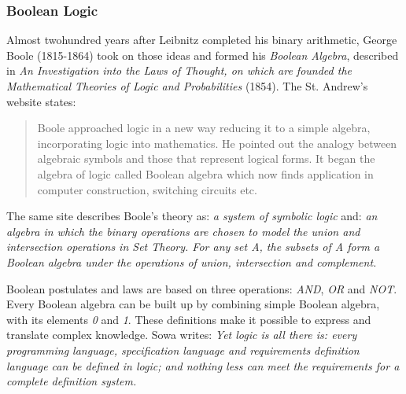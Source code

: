 %
%
%
%
%
%
%

\subsubsection{Boolean Logic}
\label{boolean_logic_heading}

Almost twohundred years after Leibnitz completed his binary arithmetic, George
Boole (1815-1864) took on those ideas and formed his \emph{Boolean Algebra},
described in \emph{An Investigation into the Laws of Thought, on which are
founded the Mathematical Theories of Logic and Probabilities} (1854). The St.
Andrew's website \cite{standrews} states:

\begin{quote}
    Boole approached logic in a new way reducing it to a simple algebra,
    incorporating logic into mathematics. He pointed out the analogy between
    algebraic symbols and those that represent logical forms. It began the
    algebra of logic called Boolean algebra which now finds application in
    computer construction, switching circuits etc.
\end{quote}

The same site describes Boole's theory as: \textit{a system of symbolic logic}
and: \textit{an algebra in which the binary operations are chosen to model the
union and intersection operations in Set Theory. For any set A, the subsets of
A form a Boolean algebra under the operations of union, intersection and
complement.}

Boolean postulates and laws \cite{belton} are based on three operations:
\emph{AND}, \emph{OR} and \emph{NOT}. Every Boolean algebra can be built up by
combining simple Boolean algebra, with its elements \emph{0} and \emph{1}.
These definitions make it possible to express and translate complex knowledge.
Sowa \cite{sowa} writes: \textit{Yet logic is all there is: every programming
language, specification language and requirements definition language can be
defined in logic; and nothing less can meet the requirements for a complete
definition system.}
